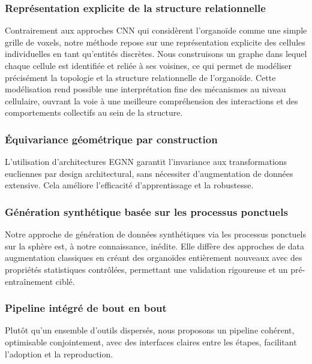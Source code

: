 \subsubsection{Représentation explicite de la structure relationnelle}

Contrairement aux approches CNN qui considèrent l’organoïde comme une simple grille de voxels, notre méthode repose sur une représentation explicite des cellules individuelles en tant qu’entités discrètes. Nous construisons un graphe dans lequel chaque cellule est identifiée et reliée à ses voisines, ce qui permet de modéliser précisément la topologie et la structure relationnelle de l’organoïde. Cette modélisation rend possible une interprétation fine des mécanismes au niveau cellulaire, ouvrant la voie à une meilleure compréhension des interactions et des comportements collectifs au sein de la structure.

\subsubsection{Équivariance géométrique par construction}

L'utilisation d'architectures EGNN garantit l'invariance aux transformations eucliennes par design architectural, sans nécessiter d'augmentation de données extensive. Cela améliore l'efficacité d'apprentissage et la robustesse.

\subsubsection{Génération synthétique basée sur les processus ponctuels}

Notre approche de génération de données synthétiques via les processus ponctuels sur la sphère est, à notre connaissance, inédite. Elle diffère des approches de data augmentation classiques en créant des organoïdes entièrement nouveaux avec des propriétés statistiques contrôlées, permettant une validation rigoureuse et un pré-entraînement ciblé.

\subsubsection{Pipeline intégré de bout en bout}

Plutôt qu'un ensemble d'outils dispersés, nous proposons un pipeline cohérent, optimisable conjointement, avec des interfaces claires entre les étapes, facilitant l'adoption et la reproduction.

